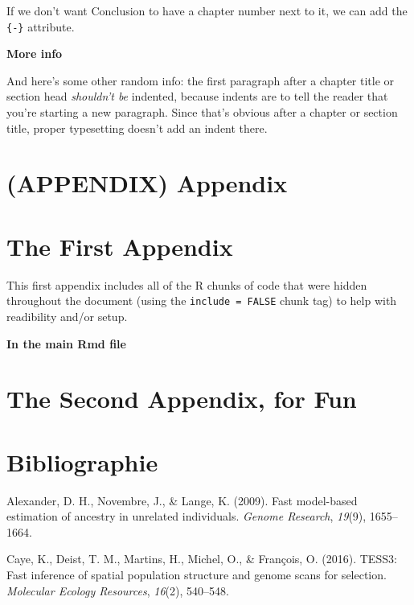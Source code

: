 \documentclass[12pt,twoside]{reedthesis}
\begin{document}
  If we don't want Conclusion to have a chapter number next to it, we can
  add the \texttt{\{-\}} attribute.
  
  \textbf{More info}
  
  And here's some other random info: the first paragraph after a chapter
  title or section head \emph{shouldn't be} indented, because indents are
  to tell the reader that you're starting a new paragraph. Since that's
  obvious after a chapter or section title, proper typesetting doesn't add
  an indent there.
  
  \chapter*{(APPENDIX) Appendix}\label{appendix-appendix}
  
  \chapter{The First Appendix}\label{the-first-appendix}
  
  This first appendix includes all of the R chunks of code that were
  hidden throughout the document (using the \texttt{include\ =\ FALSE}
  chunk tag) to help with readibility and/or setup.
  
  \textbf{In the main Rmd file}
  
  \chapter{The Second Appendix, for
  Fun}\label{the-second-appendix-for-fun}
  
  \backmatter
  
  \chapter*{Bibliographie}\label{bibliographie}
  
  \noindent
  
  \setlength{\parindent}{-0.20in} \setlength{\leftskip}{0.20in}
  \setlength{\parskip}{8pt}
  
  \hypertarget{refs}{}
  \hypertarget{ref-alexander2009fast}{}
  Alexander, D. H., Novembre, J., \& Lange, K. (2009). Fast model-based
  estimation of ancestry in unrelated individuals. \emph{Genome Research},
  \emph{19}(9), 1655--1664.
  
  \hypertarget{ref-caye2016tess3}{}
  Caye, K., Deist, T. M., Martins, H., Michel, O., \& François, O. (2016).
  TESS3: Fast inference of spatial population structure and genome scans
  for selection. \emph{Molecular Ecology Resources}, \emph{16}(2),
  540--548.
  
\end{document}
